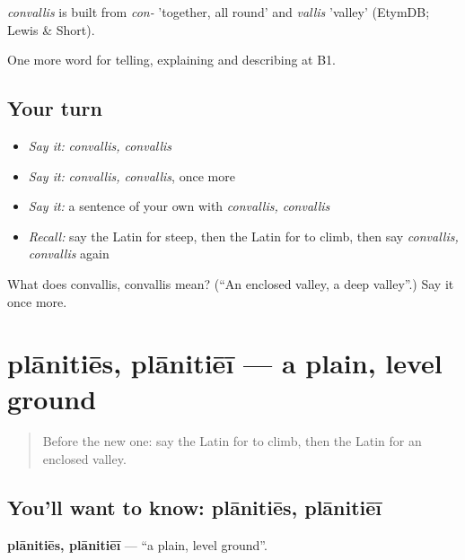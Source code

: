 \begin{cousinweb}
\emph{convallis} is built from \emph{con-} 'together, all round' and \emph{vallis} 'valley' (EtymDB; Lewis \& Short).
\end{cousinweb}

\begin{grammarlens}[title={What you've built}]
One more word for telling, explaining and describing at B1.
\end{grammarlens}

\subsection*{Your turn}
\begin{itemize}
\raggedright
  \item \emph{Say it:} \emph{convallis, convallis}
  \item \emph{Say it:} \emph{convallis, convallis}, once more
  \item \emph{Say it:} a sentence of your own with \emph{convallis, convallis}
  \item \emph{Recall:} say the Latin for steep, then the Latin for to climb, then say \emph{convallis, convallis} again
\end{itemize}

\begin{tcolorbox}[breakable,colback=teal!4,colframe=teal!35!black,title={Before you move on}]
What does convallis, convallis mean? (\textquotedblleft{}An enclosed valley, a deep valley\textquotedblright{}.) Say it once more.
\end{tcolorbox}
\section[plānitiēs, plānitiēī]{plānitiēs, plānitiēī — a plain, level ground}

\label{lesson:LA-C481-planities}



\begin{quote}
Before the new one: say the Latin for to climb, then the Latin for an enclosed valley.
\end{quote}

\subsection*{You'll want to know: plānitiēs, plānitiēī}
\textbf{plānitiēs, plānitiēī} — \textquotedblleft{}a plain, level ground\textquotedblright{}.

